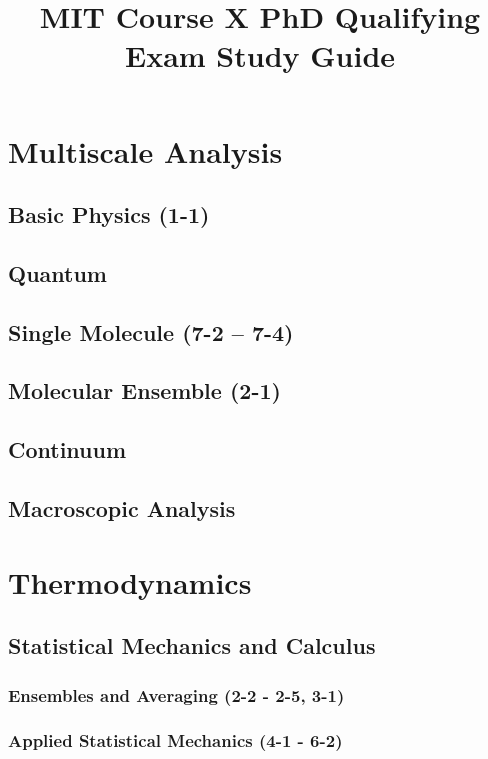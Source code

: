 \documentclass{mitqualif}
\title{MIT Course X PhD Qualifying Exam Study Guide}
\begin{document}
\mytitlepage %
\newpage

\tableofcontents
\newpage


\chapter{Multiscale Analysis}
\section{Basic Physics (1-1)}

\section{Quantum}
\section{Single Molecule (7-2 -- 7-4)}



\section{Molecular Ensemble (2-1)}

\section{Continuum}
\section{Macroscopic Analysis}
\clearpage
\chapter{Thermodynamics}
\section{Statistical Mechanics and Calculus}
\subsection{Ensembles and Averaging (2-2 - 2-5, 3-1)}





\clearpage
\subsection{Applied Statistical Mechanics (4-1 - 6-2)}





\end{document}
